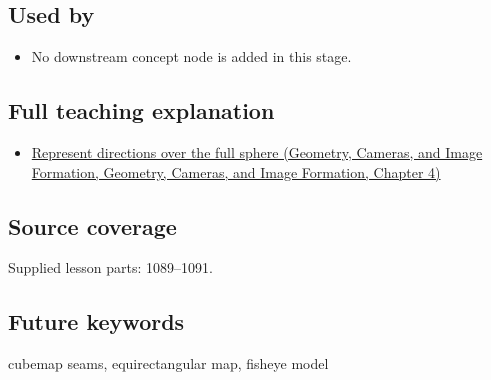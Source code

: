 \subsection{Used by}\label{appendix-fc99ad39f351-used-by}

\begin{itemize}
\tightlist
\item
  No downstream concept node is added in this stage.
\end{itemize}

\subsection{Full teaching explanation}\label{appendix-fc99ad39f351-full-teaching-explanation}

\begin{itemize}
\tightlist
\item
  \href{../03-Geometry-Cameras-and-Image-Formation/main.pdf\#nameddest=02-foundations-ii-ch035-represent-directions-over-the-full-sphere}{Represent directions over the full sphere (Geometry, Cameras, and Image Formation, Geometry, Cameras, and Image Formation, Chapter 4)}
\end{itemize}

\subsection{Source coverage}\label{appendix-fc99ad39f351-source-coverage}

Supplied lesson parts: 1089--1091.

\subsection{Future keywords}\label{appendix-fc99ad39f351-future-keywords}

cubemap seams, equirectangular map, fisheye model
